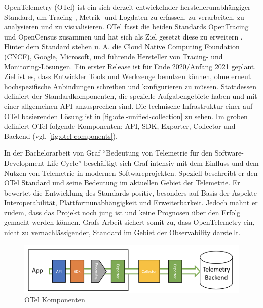 OpenTelemetry (OTel) \cite{OpenTelemetry} ist ein sich derzeit entwickelnder herstellerunabhängiger Standard, um Tracing-, Metrik- und Logdaten\footnotemark{} zu erfassen, zu verarbeiten, zu analysieren und zu visualisieren. OTel fasst die beiden Standards OpenTracing und OpenCensus \cite{OpenCensus} zusammen und hat sich als Ziel gesetzt diese zu erweitern \cite{UseNixDistributiveTracing}. Hinter dem Standard stehen u. A. die Cloud Native Computing Foundation (CNCF), Google, Microsoft, und führende Hersteller von Tracing- und Monitoring-Lösungen. Ein erster Release ist für Ende 2020/Anfang 2021 geplant. Ziel ist es, dass Entwickler Tools und Werkzeuge benutzen können, ohne erneut hochspezifische Anbindungen schreiben und konfigurieren zu müssen. Stattdessen definiert der Standardkomponenten, die spezielle Aufgabengebiete haben und mit einer allgemeinen API anzusprechen sind. Die technische Infrastruktur einer auf OTel basierenden Lösung ist in \autoref{fig:otel-unified-collection} zu sehen. Im groben definiert OTel folgende Komponenten: API, SDK, Exporter, Collector und Backend (vgl. \autoref{fig:otel-components}).

In der Bachelorarbeit von Graf \enquote{Bedeutung von Telemetrie für den Software-Development-Life-Cycle} \cite{MichaelGrafBA} beschäftigt sich Graf intensiv mit dem Einfluss und dem Nutzen von Telemetrie in modernen Softwareprojekten. Speziell beschreibt er den OTel Standard und seine Bedeutung im aktuellen Gebiet der Telemetrie. Er bewertet die Entwicklung des Standards positiv, besonders auf Basis der Aspekte Interoperabilität, Plattformunabhängigkeit und Erweiterbarkeit. Jedoch mahnt er zudem, dass das Projekt noch jung ist und keine Prognosen über den Erfolg gemacht werden können. Grafs Arbeit sichert somit zu, dass OpenTelemetry ein, nicht zu vernachlässigender, Standard im Gebiet der Observability darstellt.


\begin{figure}[H]
	\centering
	\includegraphics[width=0.55\linewidth]{img/03_methoden/dynatrace_otel-components.png}
	\caption{OTel Komponenten \cite{DynatraceOTelComponents}}
	\label{fig:otel-components}
\end{figure}

